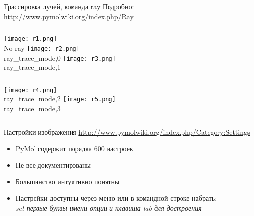         
\begin{frame}{Трассировка лучей, команда ray }
	\small
	Подробно: \url{http://www.pymolwiki.org/index.php/Ray} \\
	\begin{columns}
		\texttt{[image: r1.png]} \\
		No ray
		\texttt{[image: r2.png]} \\
		ray\_trace\_mode,0
		\texttt{[image: r3.png]} \\
		ray\_trace\_mode,1
	\end{columns} 
	\begin{columns}
		\column{0.3\textwidth}
		\texttt{[image: r4.png]} \\
		ray\_trace\_mode,2
		\column{0.3\textwidth}
		\texttt{[image: r5.png]} \\
		ray\_trace\_mode,3
	\end{columns}
\end{frame}

\begin{frame}[plain]
	\centering
\end{frame}

\begin{frame}{Настройки изображения}
	\url{http://www.pymolwiki.org/index.php/Category:Settings}
	\begin{itemize}
		\item PyMol содержит порядка 600 настроек
		\item Не все документированы
		\item Большинство интуитивно понятны
		\item Настройки доступны через меню или в командной строке набрать: \\
			\textit{set {первые буквы имени опции} и клавиша tab для достроения}
	\end{itemize}
\end{frame}

